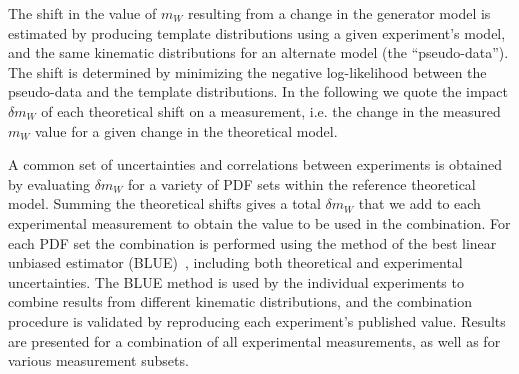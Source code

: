 The shift in the value of $m_W$ resulting from a change in the generator model is estimated by producing 
template distributions using a given experiment's model, and the same kinematic distributions for an 
alternate model (the “pseudo-data”).  The shift is determined by minimizing the negative log-likelihood
between the pseudo-data and the template distributions.
In the following we quote the impact $\delta m_W$ of each theoretical shift on a
measurement, i.e. the change in the measured $m_W$ value for a given change in the theoretical model.

A common set of uncertainties and correlations between experiments is obtained by evaluating $\delta m_W$ 
for a variety of PDF sets within the reference theoretical model.  Summing the theoretical shifts gives a
total $\delta m_W$ that we add to each experimental measurement to obtain the value to be used in the
combination.  For each PDF set the combination is performed using the method 
of the best linear unbiased estimator (BLUE)~\cite{Valassi:2003mu}, including both theoretical and experimental 
uncertainties.  The BLUE method is used by the individual experiments to combine results from different 
kinematic distributions, and the combination procedure is validated by reproducing each experiment's published 
value.  Results are presented for a combination of all experimental measurements, as well as for various 
measurement subsets.
